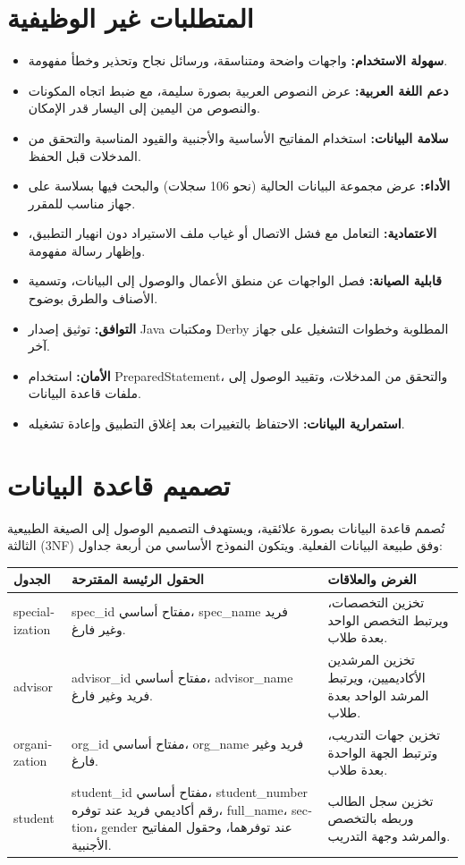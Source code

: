 \documentclass[12pt,a4paper]{article}
\begin{document}
\section{المتطلبات غير الوظيفية}
\begin{itemize}
\item \textbf{سهولة الاستخدام:} واجهات واضحة ومتناسقة، ورسائل نجاح وتحذير وخطأ مفهومة.
\item \textbf{دعم اللغة العربية:} عرض النصوص العربية بصورة سليمة، مع ضبط اتجاه المكونات والنصوص من اليمين إلى اليسار قدر الإمكان.
\item \textbf{سلامة البيانات:} استخدام المفاتيح الأساسية والأجنبية والقيود المناسبة والتحقق من المدخلات قبل الحفظ.
\item \textbf{الأداء:} عرض مجموعة البيانات الحالية (نحو 106 سجلات) والبحث فيها بسلاسة على جهاز مناسب للمقرر.
\item \textbf{الاعتمادية:} التعامل مع فشل الاتصال أو غياب ملف الاستيراد دون انهيار التطبيق، وإظهار رسالة مفهومة.
\item \textbf{قابلية الصيانة:} فصل الواجهات عن منطق الأعمال والوصول إلى البيانات، وتسمية الأصناف والطرق بوضوح.
\item \textbf{التوافق:} توثيق إصدار Java ومكتبات Derby المطلوبة وخطوات التشغيل على جهاز آخر.
\item \textbf{الأمان:} استخدام \textenglish{PreparedStatement}، والتحقق من المدخلات، وتقييد الوصول إلى ملفات قاعدة البيانات.
\item \textbf{استمرارية البيانات:} الاحتفاظ بالتغييرات بعد إغلاق التطبيق وإعادة تشغيله.
\end{itemize}

\section{تصميم قاعدة البيانات}
تُصمم قاعدة البيانات بصورة علائقية، ويستهدف التصميم الوصول إلى الصيغة الطبيعية الثالثة (3NF) وفق طبيعة البيانات الفعلية. ويتكون النموذج الأساسي من أربعة جداول:

\begin{tabularx}{\textwidth}{|p{3cm}|Y|Y|}
\hline
\textbf{الجدول} & \textbf{الحقول الرئيسة المقترحة} & \textbf{الغرض والعلاقات}\\ \hline
\textenglish{specialization} & \textenglish{spec\_id} مفتاح أساسي، \textenglish{spec\_name} فريد وغير فارغ. & تخزين التخصصات، ويرتبط التخصص الواحد بعدة طلاب.\\ \hline
\textenglish{advisor} & \textenglish{advisor\_id} مفتاح أساسي، \textenglish{advisor\_name} فريد وغير فارغ. & تخزين المرشدين الأكاديميين، ويرتبط المرشد الواحد بعدة طلاب.\\ \hline
\textenglish{organization} & \textenglish{org\_id} مفتاح أساسي، \textenglish{org\_name} فريد وغير فارغ. & تخزين جهات التدريب، وترتبط الجهة الواحدة بعدة طلاب.\\ \hline
\textenglish{student} & \textenglish{student\_id} مفتاح أساسي، \textenglish{student\_number} رقم أكاديمي فريد عند توفره، \textenglish{full\_name}، \textenglish{section}، \textenglish{gender} عند توفرهما، وحقول المفاتيح الأجنبية. & تخزين سجل الطالب وربطه بالتخصص والمرشد وجهة التدريب.\\ \hline
\end{tabularx}
\end{document}
